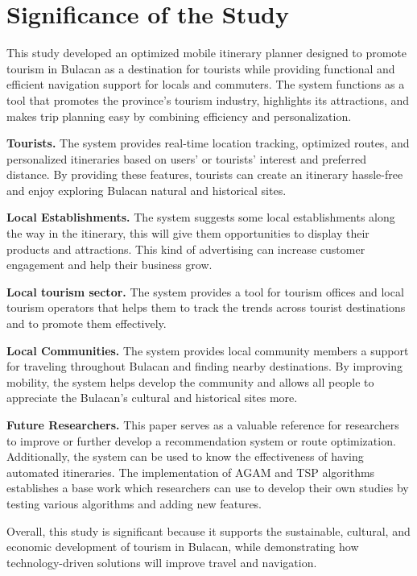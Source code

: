 \section{Significance of the Study}
This study developed an optimized mobile itinerary planner designed to promote tourism in Bulacan as a destination for tourists while providing functional and efficient navigation support for locals and commuters. The system functions as a tool that promotes the province’s tourism industry, highlights its attractions, and makes trip planning easy by combining efficiency and personalization.

\textbf{Tourists.} The system provides real-time location tracking, optimized routes, and personalized itineraries based on users’ or tourists’ interest and preferred distance. By providing these features, tourists can create an itinerary hassle-free and enjoy exploring Bulacan natural and historical sites.

\textbf{Local Establishments.} The system suggests some local establishments along the way in the itinerary, this will give them opportunities to display their products and attractions. This kind of advertising can increase customer engagement and help their business grow.

\textbf{Local tourism sector.} The system provides a tool for  tourism offices and local tourism operators that helps them to track the trends across tourist destinations and to promote them effectively.

\textbf{Local Communities.} The system provides local community members a support  for traveling throughout Bulacan and finding nearby destinations. By improving mobility, the system helps develop the community and allows all people to appreciate the Bulacan’s cultural and historical sites more.

\textbf{Future Researchers.} This paper serves as a valuable reference for researchers to improve or further develop a recommendation system or route optimization. Additionally, the system can be used  to know the effectiveness of having automated itineraries. The implementation of AGAM and TSP algorithms establishes a base work which researchers can use to develop their own studies by testing various algorithms and adding new features.

Overall, this study is significant because it supports the sustainable, cultural, and economic development of tourism in Bulacan, while demonstrating how technology-driven solutions will improve travel and navigation.


